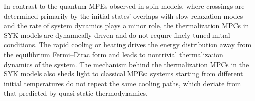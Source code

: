 \documentclass[prl,superscriptaddress,notitlepage,showpacs,twocolumn]{revtex4-2}
\begin{document}
In contrast to the quantum MPEs observed in spin models, where crossings are determined primarily by the initial states’ overlaps with slow relaxation modes and the rate of system dynamics plays a minor role, the thermalization MPCs in SYK models are dynamically driven and do not require finely tuned initial conditions. The rapid cooling or heating drives the energy distribution away from the equilibrium Fermi–Dirac form and leads to nontrivial thermalization dynamics of the system. 
The mechanism behind the thermalization MPCs in the SYK models also sheds light to classical MPEs: systems starting from different initial temperatures do not repeat the same cooling paths, which deviate from that predicted by quasi-static thermodynamics. %
\end{document}
